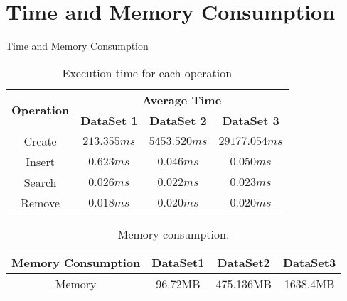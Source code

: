 \section{Time and Memory Consumption}
\begin{frame}{Time and Memory Consumption}
	
  \begin{table}
  \centering
  \caption{Execution time for each operation}
  \label{tab:exTime}
  \begin{tabular}{cccc}
  \hline
  \multirow{2}{*}{\textbf{Operation}} & \multicolumn{3}{c}{\textbf{Average Time}}                    \\ \cline{2-4} 
                                      & \textbf{DataSet 1} & \textbf{DataSet 2} & \textbf{DataSet 3} \\ \hline
  Create                              & $213.355ms$        & $5453.520ms$       & $29177.054ms$      \\
  Insert                              & $0.623ms$          & $0.046ms$          & $0.050ms$          \\
  Search                              & $0.026ms$          & $0.022ms$          & $0.023ms$          \\
  Remove                              & $0.018ms$          & $0.020ms$          & $0.020ms$          \\ \hline
  \end{tabular}
  \end{table}

  \begin{table}[h]
    \centering
    \caption{Memory consumption.}
    \label{table:mem}
    \begin{tabular}{cccc}
      \hline\rule{0pt}{2ex}
      \textbf{Memory Consumption} & \textbf{DataSet1} & \textbf{DataSet2} & \textbf{DataSet3} \\ \hline\rule{0pt}{2ex}
      Memory                     & 96.72MB & 475.136MB & 1638.4MB           \\ \hline
    \end{tabular}
  \end{table}
\end{frame}